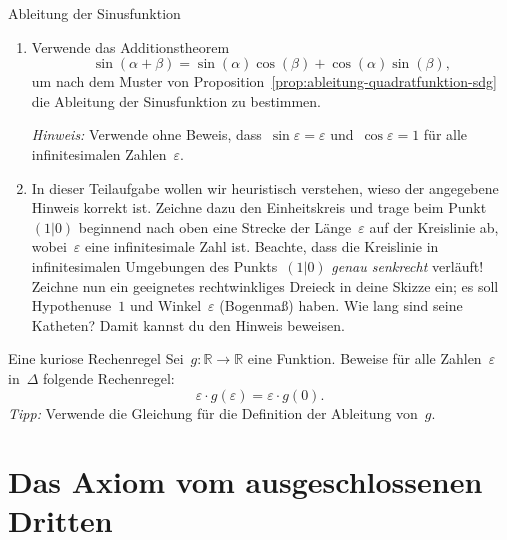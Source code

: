 \documentclass[twoside]{../zirkelblatt}
\newcommand{\RR}{\mathbb{R}}
\theoremstyle{definition}
\theoremstyle{plain}
\theoremstyle{remark}
\begin{document}
\begin{aufgabeShaded}{Ableitung der Sinusfunktion}
\begin{enumerate}
\item Verwende das Additionstheorem
\[ \sin(\alpha+\beta) = \sin(\alpha)\cos(\beta) + \cos(\alpha)\sin(\beta), \]
um nach dem Muster von Proposition~\ref{prop:ableitung-quadratfunktion-sdg} die
Ableitung der Sinusfunktion zu bestimmen.

\emph{Hinweis:} Verwende ohne Beweis, dass~$\sin\varepsilon = \varepsilon$
und~$\cos\varepsilon = 1$ für alle infinitesimalen Zahlen~$\varepsilon$.

\item In dieser Teilaufgabe wollen wir heuristisch verstehen, wieso der
angegebene Hinweis korrekt ist. Zeichne dazu den Einheitskreis und trage beim
Punkt~$(1|0)$ beginnend nach oben eine Strecke der Länge~$\varepsilon$ auf der
Kreislinie ab, wobei~$\varepsilon$ eine infinitesimale Zahl ist. Beachte, dass
die Kreislinie in infinitesimalen Umgebungen des Punkts~$(1|0)$ \emph{genau
senkrecht} verläuft! Zeichne nun ein geeignetes rechtwinkliges Dreieck in deine
Skizze ein; es soll Hypothenuse~$1$ und Winkel~$\varepsilon$ (Bogenmaß) haben. Wie lang
sind seine Katheten? Damit kannst du den Hinweis beweisen.
\end{enumerate}
\end{aufgabeShaded}

\begin{aufgabeShaded}{Eine kuriose Rechenregel}
\label{aufg:kurios}
Sei~$g : \RR \to \RR$ eine Funktion. Beweise für alle Zahlen~$\varepsilon$
in~$\Delta$ folgende Rechenregel:
\[ \varepsilon \cdot g(\varepsilon) = \varepsilon \cdot g(0). \]
\emph{Tipp:} Verwende die Gleichung für die Definition der Ableitung von~$g$.
\end{aufgabeShaded}



\section{Das Axiom vom ausgeschlossenen Dritten}
\label{sect:lem}
\end{document}
